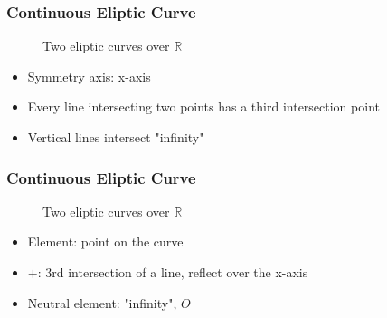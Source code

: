 \documentclass{beamer}
\begin{document}
%	
\begin{frame}
\frametitle{Continuous Eliptic Curve}
\begin{figure}
	\centering
	\def\svgwidth{\columnwidth}
	
	\caption{Two eliptic curves over $\mathbb{R}$ \cite{wikiYassineMrabet}}
\end{figure}
\begin{itemize}
	\pause
	\item Symmetry axis: x-axis
	\pause
	\item Every line intersecting two points has a third intersection point
	\pause
	\item Vertical lines intersect "infinity"
\end{itemize}
\end{frame}
\begin{frame}
\frametitle{Continuous Eliptic Curve}
\begin{figure}
	\centering
	\def\svgwidth{\columnwidth}
	
	\caption{Two eliptic curves over $\mathbb{R}$ \cite{wikiYassineMrabet}}
\end{figure}
\begin{itemize}
	\pause
	\item Element: point on the curve
	\pause
	\item $+$: 3rd intersection of a line, reflect over the x-axis
	\pause
	\item Neutral element: "infinity", $O$
\end{itemize}
\end{frame}
\end{document}
